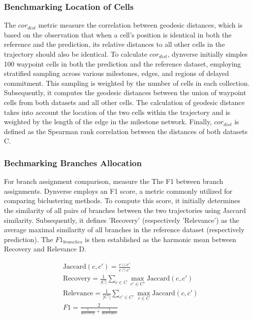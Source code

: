\subsubsection{Benchmarking Location of Cells}

The $cor_{dist}$ metric measure the correlation between geodesic distances, which is based on the observation that when a cell's position is identical in both the reference and the prediction, its relative distances to all other cells in the trajectory should also be identical. To calculate $cor_{dist}$, dynverse initially simples 100 waypoint cells in both the prediction and the reference dataset, employing stratified sampling across various milestones, edges, and regions of delayed commitment. This sampling is weighted by the number of cells in each collection. Subsequently, it computes the geodesic distances between the union of waypoint cells from both datasets and all other cells. The calculation of geodesic distance takes into account the location of the two cells within the trajectory and is weighted by the length of the edge in the milestone network. Finally, $cor_{dist}$ is defined as the Spearman rank correlation between the distances of both datasets C.

\subsubsection{Bechmarking Branches Allocation}
For branch assignment comparison, measure the The F1 between branch assignments. Dynverse employs an F1 score, a metric commonly utilized for comparing biclustering methods. To compute this score, it initially determines the similarity of all pairs of branches between the two trajectories using Jaccard similarity. Subsequently, it defines 'Recovery' (respectively 'Relevance') as the average maximal similarity of all branches in the reference dataset (respectively prediction). The $F1_{branches}$ is then established as the harmonic mean between Recovery and Relevance D.

\begin{equation}
\label{eqn:corrdist}
\begin{aligned}
& \text{Jaccard}(c, c')  = \frac{c\cup c'}{c\cap c'} \\
& \text{Recovery} = \frac{1}{|C|}\sum_{c\in C} \max_{c'\in C'} \text{Jaccard}(c, c') \\
& \text{Relevance} = \frac{1}{|C'|}\sum_{c' \in C'} \max_{c\in C} \text{Jaccard}(c, c')\\
& F1 = \frac{2}{\frac{1}{\text{Recovery}} + \frac{1}{\text{Relevance}}}
\end{aligned}
\end{equation}

